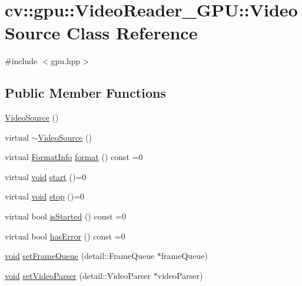 \hypertarget{classcv_1_1gpu_1_1VideoReader__GPU_1_1VideoSource}{\section{cv\-:\-:gpu\-:\-:Video\-Reader\-\_\-\-G\-P\-U\-:\-:Video\-Source Class Reference}
\label{classcv_1_1gpu_1_1VideoReader__GPU_1_1VideoSource}
}


{\ttfamily \#include $<$gpu.\-hpp$>$}

\subsection*{Public Member Functions}
\begin{DoxyCompactItemize}
\item 
\hyperlink{classcv_1_1gpu_1_1VideoReader__GPU_1_1VideoSource_a51a5f17a2f3073d98f85f63b6df5c161}{Video\-Source} ()
\item 
virtual \hyperlink{classcv_1_1gpu_1_1VideoReader__GPU_1_1VideoSource_a09b5047e0cdc07ef132e1cdd3ae32612}{$\sim$\-Video\-Source} ()
\item 
virtual \hyperlink{structcv_1_1gpu_1_1VideoReader__GPU_1_1FormatInfo}{Format\-Info} \hyperlink{classcv_1_1gpu_1_1VideoReader__GPU_1_1VideoSource_a33f91b3b49e5fd57dcf3bd5926e44985}{format} () const =0
\item 
virtual \hyperlink{legacy_8hpp_a8bb47f092d473522721002c86c13b94e}{void} \hyperlink{classcv_1_1gpu_1_1VideoReader__GPU_1_1VideoSource_a627071b28ff464bf11e9e13f418463f0}{start} ()=0
\item 
virtual \hyperlink{legacy_8hpp_a8bb47f092d473522721002c86c13b94e}{void} \hyperlink{classcv_1_1gpu_1_1VideoReader__GPU_1_1VideoSource_af1ba0851c67d6b0b0967d6c3fbe5036b}{stop} ()=0
\item 
virtual bool \hyperlink{classcv_1_1gpu_1_1VideoReader__GPU_1_1VideoSource_a0e53b56adc811f1fb67dd210f6c79297}{is\-Started} () const =0
\item 
virtual bool \hyperlink{classcv_1_1gpu_1_1VideoReader__GPU_1_1VideoSource_a2c789baa7fbec6b3f753ac30c9813fdb}{has\-Error} () const =0
\item 
\hyperlink{legacy_8hpp_a8bb47f092d473522721002c86c13b94e}{void} \hyperlink{classcv_1_1gpu_1_1VideoReader__GPU_1_1VideoSource_a685f8c0310e885841aee10cf019897ed}{set\-Frame\-Queue} (detail\-::\-Frame\-Queue $\ast$frame\-Queue)
\item 
\hyperlink{legacy_8hpp_a8bb47f092d473522721002c86c13b94e}{void} \hyperlink{classcv_1_1gpu_1_1VideoReader__GPU_1_1VideoSource_a1f1313d4699ba15e2740efd4b69e1eae}{set\-Video\-Parser} (detail\-::\-Video\-Parser $\ast$video\-Parser)
\end{DoxyCompactItemize}
